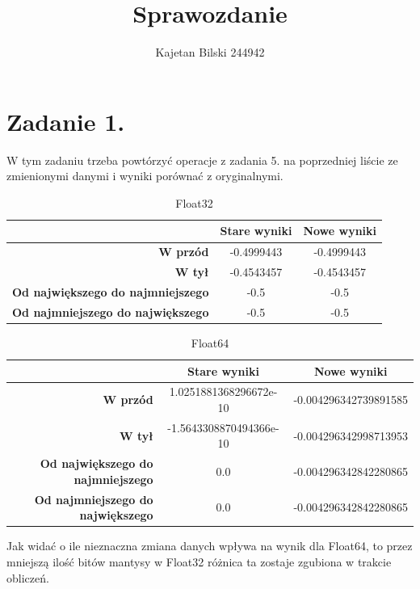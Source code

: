 \documentclass{article}
\title{Sprawozdanie}
\author{Kajetan Bilski 244942}
\begin{document}
	\maketitle
\section{Zadanie 1.}
W tym zadaniu trzeba powtórzyć operacje z zadania 5. na poprzedniej liście ze zmienionymi danymi i wyniki porównać z oryginalnymi.
\begin{table}[h!]
  \begin{center}
    \caption{Float32}
    \label{tab:table1}
    \begin{tabular}{r|c|c}
      & \textbf{Stare wyniki} & \textbf{Nowe wyniki}\\
      \hline
      \textbf{W przód} & -0.4999443 & -0.4999443\\
      \textbf{W tył} &  -0.4543457 & -0.4543457\\
      \textbf{Od największego do najmniejszego} & -0.5 & -0.5\\
      \textbf{Od najmniejszego do największego} & -0.5 & -0.5\\
    \end{tabular}
  \end{center}
\end{table}
\begin{table}[H]
	\begin{center}
		\caption{Float64}
		\label{tab:table2}
		\begin{tabular}{r|c|c}
			& \textbf{Stare wyniki} & \textbf{Nowe wyniki}\\
			\hline
			\textbf{W przód} & 1.0251881368296672e-10 & -0.004296342739891585\\
			\textbf{W tył} & -1.5643308870494366e-10 & -0.004296342998713953\\
			\textbf{Od największego do najmniejszego} & 0.0 & -0.004296342842280865\\
			\textbf{Od najmniejszego do największego} & 0.0 & -0.004296342842280865\\
		\end{tabular}
	\end{center}
\end{table}
Jak widać o ile nieznaczna zmiana danych wpływa na wynik dla Float64, to przez mniejszą ilość bitów mantysy w Float32 różnica ta zostaje zgubiona w trakcie obliczeń.
\end{document}
